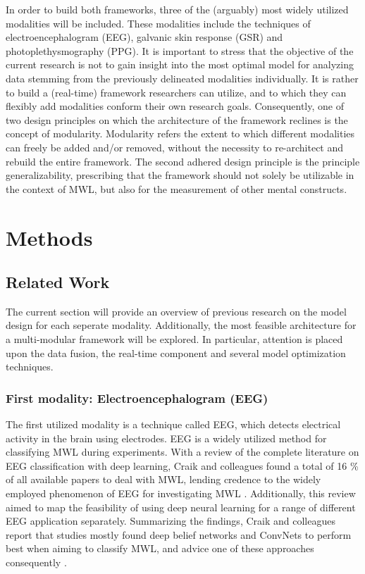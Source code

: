 \documentclass{article}
\begin{document}
In order to build both frameworks, three of the (arguably) most widely utilized modalities will be included. These modalities include the techniques of electroencephalogram (EEG), galvanic skin response (GSR) and photoplethysmography (PPG). It is important to stress that the objective of the current research is not to gain insight into the most optimal model for analyzing data stemming from the previously delineated modalities individually. It is rather to build a (real-time) framework researchers can utilize, and to which they can flexibly add modalities conform their own research goals. Consequently, one of two design principles on which the architecture of the framework reclines is the concept of modularity. Modularity refers the extent to which different modalities can freely be added and/or removed, without the necessity to re-architect and rebuild the entire framework. The second adhered design principle is the principle generalizability, prescribing that the framework should not solely be utilizable in the context of MWL, but also for the measurement of other mental constructs.

\newpage
\section{Methods}

\subsection{Related Work} \label{Relatedwork}
The current section will provide an overview of previous research on the model design for each seperate modality. Additionally,  the most feasible architecture for a multi-modular framework will be explored. In particular, attention is placed upon the data fusion, the real-time component and several model optimization techniques.

\subsubsection{First modality: Electroencephalogram (EEG)}
The first utilized modality is a technique  called EEG, which detects electrical activity in the brain using electrodes. EEG is a widely utilized method for classifying MWL during experiments. With a review of the complete literature on EEG classification with deep learning, Craik and colleagues found a total of 16 \% of all available papers to deal with MWL, lending credence to the widely employed phenomenon of EEG for investigating MWL \cite{craik2019deep}. Additionally, this review aimed to map the feasibility of using deep neural learning for a range of different EEG application separately. Summarizing the findings, Craik and colleagues report that studies mostly found deep belief networks and ConvNets to perform best when aiming to classify MWL, and advice one of these approaches consequently \cite{craik2019deep}.
\end{document}
